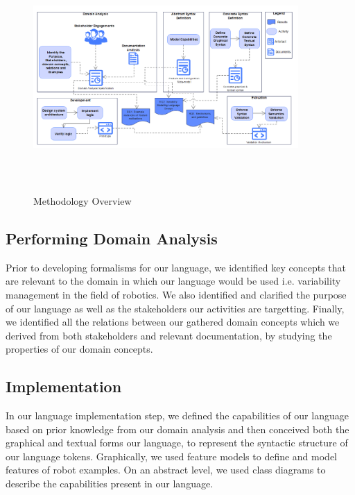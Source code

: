 \documentclass[conference]{IEEEtran}
\begin{document}
\begin{figure}[h]
\caption{Methodology Overview}
\centering
\includegraphics[height=8cm, width=0.9\textwidth]{diagrams/methods-new.png}
\label{methover}
\end{figure}

\subsection{Performing Domain Analysis}
Prior to developing formalisms for our language, we identified key concepts that are relevant to the domain in which our language would be used i.e. variability management in the field of robotics. We also identified and clarified the purpose of our language as well as the stakeholders our activities are targetting. Finally, we identified all the relations between our gathered domain concepts which we derived from both stakeholders and relevant documentation, by studying the properties of our domain concepts.

\subsection{Implementation}
In our language implementation step, we defined the capabilities of our language based on prior knowledge from our domain analysis and then conceived both the graphical and textual forms our language, to represent the syntactic structure of our language tokens. Graphically, we used feature models to define and model features of robot examples. On an abstract level, we used class diagrams to describe the capabilities present in our language.
\end{document}
